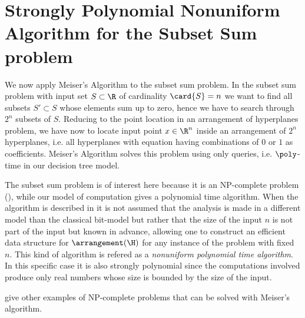 \section{Strongly Polynomial Nonuniform Algorithm for the Subset Sum problem}

We now apply Meiser's Algorithm to the subset sum problem. In the subset sum
problem with input set $S \subset \R$ of cardinality $\card{S} = n$ we want to
find all subsets $S' \subset S$ whose elements sum up to zero, hence we have
to search through $2^n$ subsets of $S$. Reducing to the point location in an
arrangement of hyperplanes problem, we have now to locate input point $x \in
\R^n$ inside an arrangement of $2^n$ hyperplanes, i.e. all hyperplanes with
equation having combinations of $0$ or $1$ as coefficients. Meiser's Algorithm
solves this problem using only  queries, i.e. $\poly$-time
in our decision tree model.

The subset sum problem is of interest here because it is an NP-complete problem
(\cite{karp:1972}), while our model of computation gives a polynomial time
algorithm. When the algorithm is described in \cite{burgisser:1997} it is not
assumed that the analysis is made in a different model than the classical
bit-model but rather that the size of the input $n$ is not part of the input
but known in advance, allowing one to construct an efficient data structure for
$\arrangement(\H)$ for any instance of the problem with fixed $n$. This kind of
algorithm is refered as a \emph{nonuniform polynomial time algorithm}.  In
this specific case it is also strongly polynomial since the computations
involved produce only real numbers whose size is bounded by the size of the
input.

\citet*{meiser:1993,burgisser:1997} give other examples of
NP-complete problems that can be solved with Meiser's algorithm.
